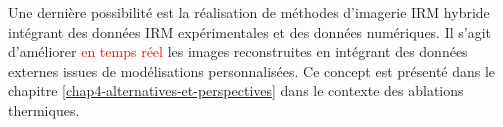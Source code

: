 Une dernière possibilité est la réalisation de méthodes d'imagerie IRM hybride intégrant des données IRM expérimentales et des données numériques. Il s'agit d'améliorer \textcolor{red}{en temps réel} les images reconstruites en intégrant des données externes issues de modélisations personnalisées. Ce concept est présenté dans le chapitre \ref{chap4-alternatives-et-perspectives} dans le contexte des ablations thermiques.\\
